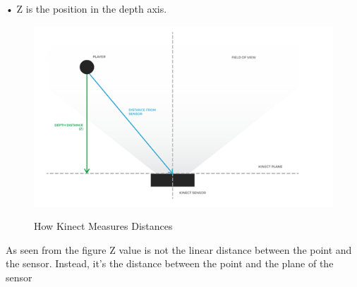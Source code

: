 •	Z is the position in the depth axis.


\begin{figure}[H]
\centering
{\includegraphics[scale=0.75]{figsensor.png}}
\caption{How Kinect Measures Distances}
\end{figure}

\noindent As seen from the figure
Z value is not the linear distance between the point and the sensor. Instead, it’s the distance between the point and the plane of the sensor



